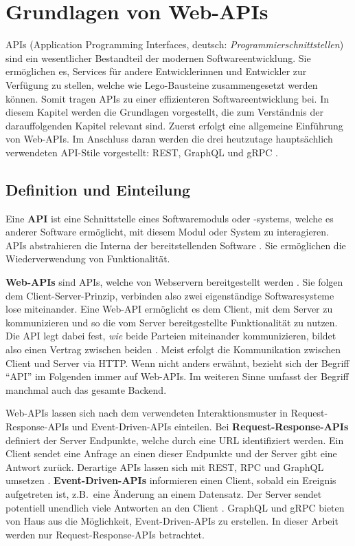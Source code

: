 \chapter{Grundlagen von Web-APIs}\label{ch:theory}

APIs (Application Programming Interfaces, deutsch: \textit{Programmierschnittstellen}) sind ein wesentlicher Bestandteil der modernen Softwareentwicklung. Sie ermöglichen es, Services für andere Entwicklerinnen und Entwickler zur Verfügung zu stellen, welche wie Lego-Bausteine zusammengesetzt werden können. Somit tragen APIs zu einer effizienteren Softwareentwicklung bei. In diesem Kapitel werden die Grundlagen vorgestellt, die zum Verständnis der darauffolgenden Kapitel relevant sind. Zuerst erfolgt eine allgemeine Einführung von Web-APIs. Im Anschluss daran werden die drei heutzutage hauptsächlich verwendeten API-Stile vorgestellt: REST, GraphQL und gRPC \autocite[S.~300]{Lauret2019}.

\section{Definition und Einteilung}\label{sec:theory|definition-classification}
Eine \textbf{API} ist eine Schnittstelle eines Softwaremoduls oder -systems, welche es anderer Software ermöglicht, mit diesem Modul oder System zu interagieren. APIs abstrahieren die Interna der bereitstellenden Software \autocite[S.~1]{Jin2018}. Sie ermöglichen die Wiederverwendung von Funktionalität.

\textbf{Web-APIs} sind APIs, welche von Webservern bereitgestellt werden \autocite{Wiki:WebAPI}. Sie folgen dem Client-Server-Prinzip, verbinden also zwei eigenständige Softwaresysteme lose miteinander. Eine Web-API ermöglicht es dem Client, mit dem Server zu kommunizieren und so die vom Server bereitgestellte Funktionalität zu nutzen. Die API legt dabei fest, \emph{wie} beide Parteien miteinander kommunizieren, bildet also einen Vertrag zwischen beiden \autocite[S.~4--5]{Jacobson2011}. Meist erfolgt die Kommunikation zwischen Client und Server via HTTP\@. Wenn nicht anders erwähnt, bezieht sich der Begriff \enquote{API} im Folgenden immer auf Web-APIs. Im weiteren Sinne umfasst der Begriff manchmal auch das gesamte Backend.

\para{}Web-APIs lassen sich nach dem verwendeten Interaktionsmuster in Request-Response-APIs und Event-Driven-APIs einteilen. Bei \textbf{Request-Response-APIs} definiert der Server Endpunkte, welche durch eine URL identifiziert werden. Ein Client sendet eine Anfrage an einen dieser Endpunkte und der Server gibt eine Antwort zurück. Derartige APIs lassen sich mit REST, RPC und GraphQL umsetzen \autocite[S.~9]{Jin2018}. \textbf{Event-Driven-APIs} informieren einen Client, sobald ein Ereignis aufgetreten ist, z.B.\ eine Änderung an einem Datensatz. Der Server sendet potentiell unendlich viele Antworten an den Client \autocite[S.~19]{Jin2018}. GraphQL \autocite[S.~31]{Porcello2018} und gRPC \autocite[S.~2]{Indrasiri2020} bieten von Haus aus die Möglichkeit, Event-Driven-APIs zu erstellen. In dieser Arbeit werden nur Request-Response-APIs betrachtet.

